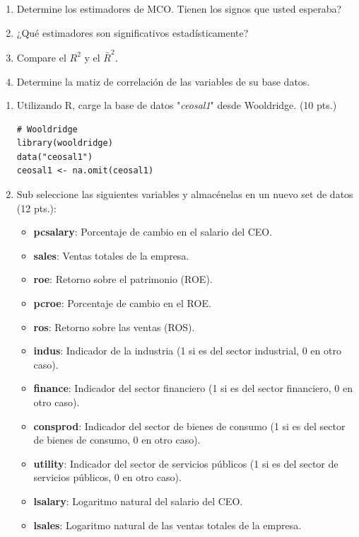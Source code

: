 \documentclass[letterpaper,11pt]{article}
\begin{document}
\begin{enumerate}
\item Determine los estimadores de MCO. Tienen los signos que usted esperaba?
\item ¿Qué estimadores son significativos estadísticamente?
\item Compare el $R^2$ y el $\bar{R}^2$.
\item Determine la matiz de correlación de las variables de su base datos.
\end{enumerate}

\begin{enumerate}
    \item Utilizando R, carge la base de datos "\textit{ceosal1}" desde Wooldridge. (10 pts.)

\begin{lstlisting}
# Wooldridge
library(wooldridge)
data("ceosal1")
ceosal1 <- na.omit(ceosal1)
\end{lstlisting}

    \item Sub seleccione las siguientes variables y almacénelas en un nuevo set de datos (12 pts.):

\begin{itemize}
\item \textbf{pcsalary}: Porcentaje de cambio en el salario del CEO.
\item \textbf{sales}: Ventas totales de la empresa.
\item \textbf{roe}: Retorno sobre el patrimonio (ROE).
\item \textbf{pcroe}: Porcentaje de cambio en el ROE.
\item \textbf{ros}: Retorno sobre las ventas (ROS).
\item \textbf{indus}: Indicador de la industria (1 si es del sector industrial, 0 en otro caso).
\item \textbf{finance}: Indicador del sector financiero (1 si es del sector financiero, 0 en otro caso).
\item \textbf{consprod}: Indicador del sector de bienes de consumo (1 si es del sector de bienes de consumo, 0 en otro caso).
\item \textbf{utility}: Indicador del sector de servicios públicos (1 si es del sector de servicios públicos, 0 en otro caso).
\item \textbf{lsalary}: Logaritmo natural del salario del CEO.
\item \textbf{lsales}: Logaritmo natural de las ventas totales de la empresa.
\end{itemize}


\end{enumerate}
\end{document}
